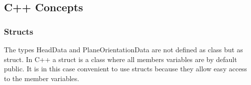 \subsection{C++ Concepts}

\subsubsection{Structs}

The types HeadData and PlaneOrientationData are not defined as class but as struct. In C++ a struct is a class where all members variables are by default public. It is in this case convenient to use structs because they allow easy access to the member variables. 